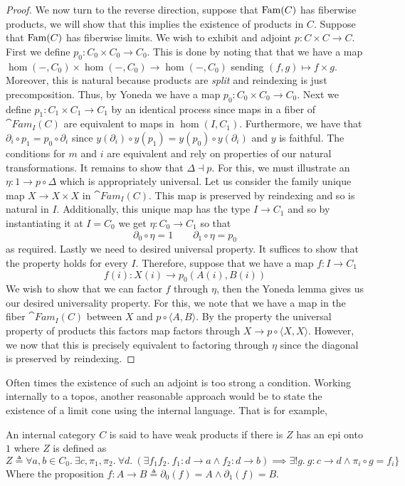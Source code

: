 \begin{proof}
  We now turn to the reverse direction, suppose that $\operatorname{Fam}(C)$ has
  fiberwise products, we will show that this implies the existence of
  products in $C$. Suppose that $\operatorname{Fam}(C)$ has fiberwise limits. We
  wish to exhibit and adjoint $p : C \times C \to C$. First we define
  $p_0 : C_0 \times C_0 \to C_0$. This is done by noting that that we
  have a map $\hom(-, C_0) \times \hom(-, C_0) \to \hom(-, C_0)$
  sending $(f, g) \mapsto f \times g$. Moreover, this is natural
  because products are \emph{split} and reindexing is just
  precomposition. Thus, by Yoneda we have a map
  $p_0 : C_0 \times C_0 \to C_0$. Next we define
  $p_1 : C_1 \times C_1 \to C_1$ by an identical process since maps in
  a fiber of $\cat{Fam}_I(C)$ are equivalent to maps in
  $\hom(I, C_1)$. Furthermore, we have that
  $\partial_i \circ p_1 = p_0 \circ \partial_i$ since
  $y(\partial_i) \circ y(p_1) = y(p_0) \circ y(\partial_i)$ and $y$ is
  faithful. The conditions for $m$ and $i$ are equivalent and rely on
  properties of our natural transformations. It remains to show that
  $\Delta \dashv p$. For this, we must illustrate an
  $\eta : 1 \to p \circ \Delta$ which is appropriately universal. Let
  us consider the family unique map $X \to X \times X$ in
  $\cat{Fam}_{I}(C)$. This map is preserved by reindexing and so is
  natural in $I$. Additionally, this unique map has the type
  $I \to C_1$ and so by instantiating it at $I = C_0$ we get
  $\eta : C_0 \to C_1$ so that
  \[
    \partial_0 \circ \eta = 1 \qquad \partial_1 \circ \eta = p_0
  \]
  as required. Lastly we need to desired universal property. It
  suffices to show that the property holds for every $I$. Therefore,
  suppose that we have a map $f : I \to C_1$
  \[
    f(i) : X(i) \to p_0(A(i), B(i))
  \]
  We wish to show that we can factor $f$ through $\eta$, then the
  Yoneda lemma gives us our desired universality property. For this,
  we note that we have a map in the fiber $\cat{Fam}_I(C)$ between $X$
  and $p \circ \langle A, B \rangle$. By the property the universal
  property of products this factors map factors through
  $X \to p \circ \langle X, X \rangle$. However, we now that this is
  precisely equivalent to factoring through $\eta$ since the diagonal
  is preserved by reindexing.
\end{proof}
Often times the existence of such an adjoint is too strong a
condition. Working internally to a topos, another reasonable approach
would be to state the existence of a limit cone using the internal
language. That is for example,
\begin{defn}\label{defn:completeness:weakproducts}
  An internal category $C$ is said to have weak products if there is
  $Z$ has an epi onto $1$ where $Z$ is defined as
  \[
    Z \triangleq \forall a, b \in C_0.\ \exists c, \pi_1, \pi_2.
    \ \forall d.\ (\exists f_1 f_2.\ f_1 : d \to a \mathrel{\wedge} f_2 : d \to b) \implies
    \exists! g.\ g : c \to d \mathrel{\wedge} \pi_i \circ g = f_i\}
  \]
  Where the proposition
  $f : A \to B \triangleq \partial_0(f) = A \mathrel{\wedge} \partial_1(f) = B$.
\end{defn}
